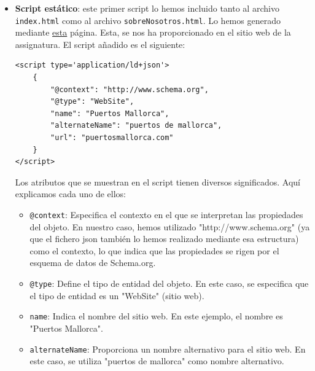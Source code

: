 \documentclass{article}
\begin{document}
\begin{itemize}
    \item \textbf{Script estático}: este primer script lo hemos incluido tanto al archivo \texttt{index.html} como al archivo \texttt{sobreNosotros.html}. Lo hemos generado mediante \href{https://hallanalysis.com/json-ld-generator/}{esta} página. Esta, se nos ha proporcionado en el sitio web de la assignatura. El script añadido es el siguiente:
    \begin{verbatim}
<script type='application/ld+json'> 
    {
        "@context": "http://www.schema.org",
        "@type": "WebSite",
        "name": "Puertos Mallorca",
        "alternateName": "puertos de mallorca",
        "url": "puertosmallorca.com"
    }
</script>
    \end{verbatim}
    Los atributos que se muestran en el script tienen diversos significados. Aquí explicamos cada uno de ellos:
    \begin{itemize}
        \item \texttt{@context}: Especifica el contexto en el que se interpretan las propiedades del objeto. En nuestro caso, hemos utilizado  "http://www.schema.org" (ya que el fichero json también lo hemos realizado mediante esa estructura) como el contexto, lo que indica que las propiedades se rigen por el esquema de datos de Schema.org.

        \item \texttt{@type}: Define el tipo de entidad del objeto. En este caso, se especifica que el tipo de entidad es un "WebSite" (sitio web).
        
        \item \texttt{name}: Indica el nombre del sitio web. En este ejemplo, el nombre es "Puertos Mallorca".
        
       \item \texttt{alternateName}: Proporciona un nombre alternativo para el sitio web. En este caso, se utiliza "puertos de mallorca" como nombre alternativo.
       

\end{itemize}
\end{itemize}
\end{document}

